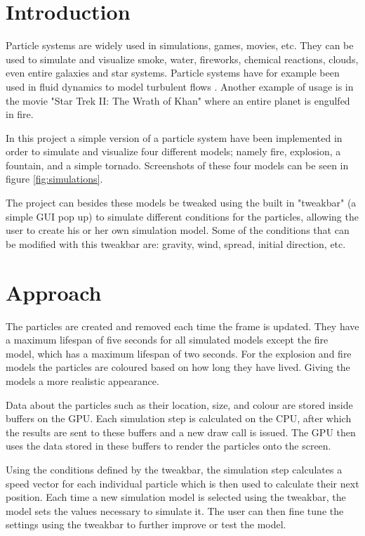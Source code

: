 \section{Introduction}
Particle systems are widely used in simulations, games, movies, etc. They can be used to simulate and visualize smoke, water, fireworks, chemical reactions, clouds, even entire galaxies and star systems. Particle systems have for example been used in fluid dynamics to model turbulent flows \cite{course_book}. Another example of usage is in the movie "Star Trek II: The Wrath of Khan" \cite{particle_systems} where an entire planet is engulfed in fire.

In this project a simple version of a particle system have been implemented in order to simulate and visualize four different models; namely fire, explosion, a fountain, and a simple tornado. Screenshots of these four models can be seen in figure \ref{fig:simulations}.

The project can besides these models be tweaked using the built in "tweakbar" (a simple GUI pop up) to simulate different conditions for the particles, allowing the user to create his or her own simulation model. Some of the conditions that can be modified with this tweakbar are: gravity, wind, spread, initial direction, etc.

\section{Approach}

The particles are created and removed each time the frame is updated. They have a maximum lifespan of five seconds for all simulated models except the fire model, which has a maximum lifespan of two seconds. For the explosion and fire models the particles are coloured based on how long they have lived. Giving the models a more realistic appearance.

Data about the particles such as their location, size, and colour are stored inside buffers on the GPU. Each simulation step is calculated on the CPU, after which the results are sent to these buffers and a new draw call is issued. The GPU then uses the data stored in these buffers to render the particles onto the screen.

Using the conditions defined by the tweakbar, the simulation step calculates a speed vector for each individual particle which is then used to calculate their next position. Each time a new simulation model is selected using the tweakbar, the model sets the values necessary to simulate it. The user can then fine tune the settings using the tweakbar to further improve or test the model.

